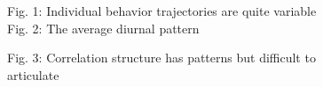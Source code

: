 \documentclass[final,plain]{beamer}
\newlength{\onecolwid}
\begin{document}
\begin{frame}[t]
\begin{columns}[t]
\begin{column}{\onecolwid}
  \end{column}

  \begin{column}{\onecolwid}

    \begin{block}

      \begin{figure}
        \begin{center}
          {\sffamily \color{jblue} Fig. 1: Individual behavior trajectories are
          quite variable}
          \\
          {\sffamily \color{jblue} Fig. 2: The average diurnal pattern}
          \\
        \end{center}
      \end{figure}
    \end{block}

    \begin{figure}
      \begin{center}
        {\sffamily \color{jblue} Fig. 3: Correlation structure has patterns but difficult to articulate}
      \end{center}
    \end{figure}

  \end{column}

      

\end{columns}
\end{frame}
\end{document}
